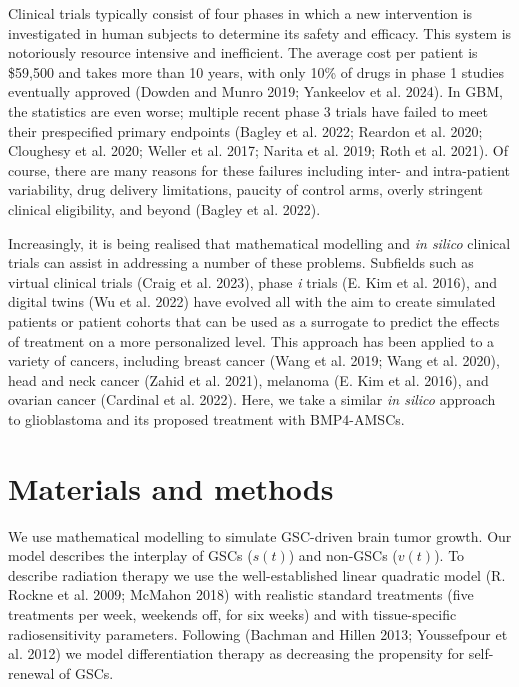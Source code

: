 \documentclass[
  default,
]{sn-jnl}
\begin{document}
Clinical trials typically consist of four phases in which a new
intervention is investigated in human subjects to determine its safety
and efficacy. This system is notoriously resource intensive and
inefficient. The average cost per patient is \$59,500 and takes more
than 10 years, with only 10\% of drugs in phase 1 studies eventually
approved (Dowden and Munro 2019; Yankeelov et al. 2024). In GBM, the
statistics are even worse; multiple recent phase 3 trials have failed to
meet their prespecified primary endpoints (Bagley et al. 2022; Reardon
et al. 2020; Cloughesy et al. 2020; Weller et al. 2017; Narita et al.
2019; Roth et al. 2021). Of course, there are many reasons for these
failures including inter- and intra-patient variability, drug delivery
limitations, paucity of control arms, overly stringent clinical
eligibility, and beyond (Bagley et al. 2022).

Increasingly, it is being realised that mathematical modelling and
\emph{in silico} clinical trials can assist in addressing a number of
these problems. Subfields such as virtual clinical trials (Craig et al.
2023), phase \emph{i} trials (E. Kim et al. 2016), and digital twins (Wu
et al. 2022) have evolved all with the aim to create simulated patients
or patient cohorts that can be used as a surrogate to predict the
effects of treatment on a more personalized level. This approach has
been applied to a variety of cancers, including breast cancer (Wang et
al. 2019; Wang et al. 2020), head and neck cancer (Zahid et al. 2021),
melanoma (E. Kim et al. 2016), and ovarian cancer (Cardinal et al.
2022). Here, we take a similar \emph{in silico} approach to glioblastoma
and its proposed treatment with BMP4-AMSCs.

\section{Materials and methods}\label{sec-materials-methods}

We use mathematical modelling to simulate GSC-driven brain tumor growth.
Our model describes the interplay of GSCs (\(s(t)\)) and non-GSCs
(\(v(t)\)). To describe radiation therapy we use the well-established
linear quadratic model (R. Rockne et al. 2009; McMahon 2018) with
realistic standard treatments (five treatments per week, weekends off,
for six weeks) and with tissue-specific radiosensitivity parameters.
Following (Bachman and Hillen 2013; Youssefpour et al. 2012) we model
differentiation therapy as decreasing the propensity for self-renewal of
GSCs.
\end{document}

